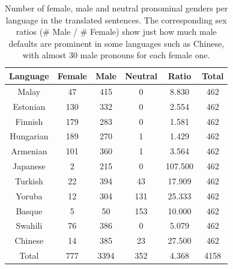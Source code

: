 \documentclass{article}
\begin{document}
\begin{table}[H]
	\centering
	\begin{tabular}{|c|c|c|c|c|c|}
	\hline
	Language & Female & Male & Neutral & Ratio & Total \\ \hline
	\hline
	Malay     & 47  & 415  & 0   & 8.830 	& 462 \\ \hline
	Estonian  & 130 & 332  & 0   & 2.554 	& 462 \\ \hline
	Finnish   & 179 & 283  & 0   & 1.581 	& 462 \\ \hline
	Hungarian & 189 & 270  & 1   & 1.429 	& 462 \\ \hline
	Armenian  & 101 & 360  & 1   & 3.564 	& 462 \\ \hline
	Japanese  & 2   & 215  & 0   & 107.500  & 462 \\ \hline
	Turkish   & 22  & 394  & 43  & 17.909	& 462 \\ \hline
	Yoruba    & 12  & 304  & 131 & 25.333	& 462 \\ \hline
	Basque    & 5   & 50   & 153 & 10.000   & 462 \\ \hline
	Swahili   & 76  & 386  & 0   & 5.079 	& 462 \\ \hline
	Chinese   & 14  & 385  & 23  & 27.500   & 462 \\ \hline
	\hline
	Total     & 777 & 3394 & 352 & 4.368	& 4158   \\ \hline
	\end{tabular}
	\caption{Number of female, male and neutral pronominal genders per language in the translated sentences. The corresponding sex ratios (\# Male / \# Female) show just how much male defaults are prominent in some languages such as Chinese, with almost 30 male pronouns for each female one.}
	\label{tab:gender-by-language}
\end{table}
\end{document}
